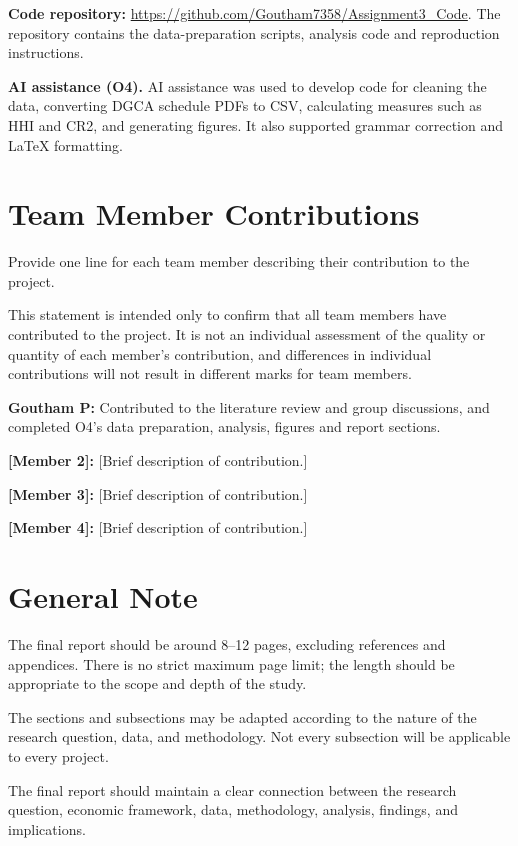 \documentclass[12pt,a4paper]{article}
\newcommand{\templatebullet}[1]{\par\noindent\textbullet\hspace{5.88pt}#1\par}
\begin{document}
\textbf{Code repository:} \href{https://github.com/Goutham7358/Assignment3_Code}{https://github.com/Goutham7358/Assignment3\_Code}. The repository contains the data-preparation scripts, analysis code and reproduction instructions.

\textbf{AI assistance (O4).} AI assistance was used to develop code for cleaning the data, converting DGCA schedule PDFs to CSV, calculating measures such as HHI and CR2, and generating figures. It also supported grammar correction and LaTeX formatting.


\section*{Team Member Contributions}
Provide one line for each team member describing their contribution to the project.

This statement is intended only to confirm that all team members have contributed to the project. It is not an individual assessment of the quality or quantity of each member's contribution, and differences in individual contributions will not result in different marks for team members.
\templatebullet{\textbf{Goutham P:} Contributed to the literature review and group discussions, and completed O4's data preparation, analysis, figures and report sections.}
\templatebullet{\textbf{[Member 2]:} [Brief description of contribution.]}
\templatebullet{\textbf{[Member 3]:} [Brief description of contribution.]}
\templatebullet{\textbf{[Member 4]:} [Brief description of contribution.]}

\newpage
\section*{General Note}
The final report should be around 8--12 pages, excluding references and appendices. There is no strict maximum page limit; the length should be appropriate to the scope and depth of the study.

The sections and subsections may be adapted according to the nature of the research question, data, and methodology. Not every subsection will be applicable to every project.

The final report should maintain a clear connection between the research question, economic framework, data, methodology, analysis, findings, and implications.
\end{document}
